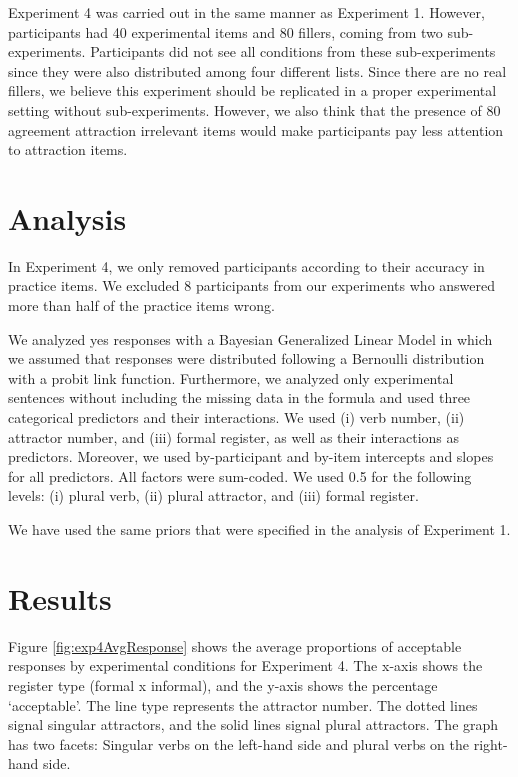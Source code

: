 Experiment 4 was carried out in the same manner as Experiment 1. However, participants had 40 experimental items and 80 fillers, coming from two sub-experiments. Participants did not see all conditions from these sub-experiments since they were also distributed among four different lists. Since there are no real fillers, we believe this experiment should be replicated in a proper experimental setting without sub-experiments. However, we also think that the presence of 80 agreement attraction irrelevant items would make participants pay less attention to attraction items. 

\section{Analysis}

In Experiment 4, we only removed participants according to their accuracy in practice items. We excluded 8 participants from our experiments who answered more than half of the practice items wrong.

We analyzed yes responses with a Bayesian Generalized Linear Model in which we assumed that responses were distributed following a Bernoulli distribution with a probit link function. Furthermore, we analyzed only experimental sentences without including the missing data in the formula and used three categorical predictors and their interactions. We used (i) verb number, (ii) attractor number, and (iii) formal register, as well as their interactions as predictors. Moreover, we used by-participant and by-item intercepts and slopes for all predictors. All factors were sum-coded. We used 0.5 for the following levels: (i) plural verb, (ii) plural attractor, and (iii) formal register. 

We have used the same priors that were specified in the analysis of Experiment 1. 

\section{Results}

Figure \ref{fig:exp4AvgResponse} shows the average proportions of acceptable responses by experimental conditions for Experiment 4. The x-axis shows the register type (formal x informal), and the y-axis shows the percentage `acceptable'. The line type represents the attractor number. The dotted lines signal singular attractors, and the solid lines signal plural attractors. The graph has two facets: Singular verbs on the left-hand side and plural verbs on the right-hand side.

